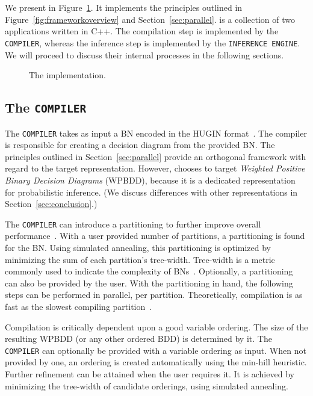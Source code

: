 \section{\toolname}

We present \toolname in Figure~\ref{fig:implementation}. It implements the principles outlined in Figure~\ref{fig:frameworkoverview} and Section~\ref{sec:parallel}. \toolname is a collection of two applications written in C++. The compilation step is implemented by the \verb+COMPILER+, whereas the inference step is implemented by the \verb+INFERENCE ENGINE+. We will proceed to discuss their internal processes in the following sections.

\begin{figure}[!t]
    \centering
    
    \caption{The implementation.}
    \label{fig:implementation}
\end{figure}

\subsection{The \texttt{COMPILER}}

The \verb+COMPILER+ takes as input a BN encoded in the HUGIN format~\cite{madsen2003hugin}. The compiler is responsible for creating a decision diagram from the provided BN. The principles outlined in Section~\ref{sec:parallel} provide an orthogonal framework with regard to the target representation. However, \toolname chooses to target \emph{Weighted Positive Binary Decision Diagrams} (WPBDD), because it is a dedicated representation for probabilistic inference. (We discuss differences with other representations in Section~\ref{sec:conclusion}.)

The \texttt{COMPILER} can introduce a partitioning to further improve overall performance~\cite{dal2017reducing}. With a user provided number of partitions, a partitioning is found for the BN. Using simulated annealing, this partitioning is optimized by minimizing the sum of each partition's tree-width. Tree-width is a metric commonly used to indicate the complexity of BNs~\cite{bollig2014width}. Optionally, a partitioning can also be provided by the user. With the partitioning in hand, the following steps can be performed in parallel, per partition. Theoretically, compilation is as fast as the slowest compiling partition~\cite{dal2018parallel}.

Compilation is critically dependent upon a good variable ordering. The size of the resulting WPBDD (or any other ordered BDD) is determined by it. The \texttt{COMPILER} can optionally be provided with a variable ordering as input. When not provided by one, an ordering is created automatically using the min-hill heuristic. Further refinement can be attained when the user requires it. It is achieved by minimizing the tree-width of candidate orderings, using simulated annealing.

